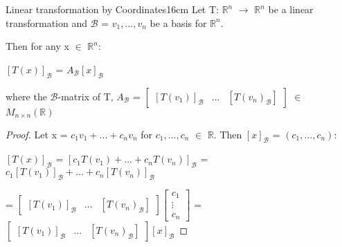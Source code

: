     \newpage



    \begin{wtheorem}{Linear transformation by Coordinates}{16cm}
        Let T: $\mathbb{R}^n$ $\rightarrow$ $\mathbb{R}^n$
        be a linear transformation and $\mathcal{B}$ = $v_1,...,v_n$
        be a basis for $\mathbb{R}^n$.
        
        Then for any x $\in$ $\mathbb{R}^n$:

        \hspace{0.5cm}
        $[T(x)]_{\mathcal{B}}$
        = $A_{\mathcal{B}}[x]_{\mathcal{B}}$

        where the {\color{lblue} $\mathcal{B}$-matrix of T}, $A_{\mathcal{B}}$ =
        $\begin{bmatrix}
            [T(v_1)]_{\mathcal{B}} & ... & [T(v_n)_{\mathcal{B}}]
        \end{bmatrix}$ $\in$ $M_{n \times n}(\mathbb{R})$
    \end{wtheorem}

    \begin{proof}
        Let x = $c_1v_1 + ... + c_nv_n$ for $c_1,...,c_n$ $\in$ $\mathbb{R}$.
        Then $[x]_{\mathcal{B}}$ = $(c_1,...,c_n)$:

        \hspace{0.5cm}
        $[T(x)]_{\mathcal{B}}$
        = $[c_1T(v_1) + ... + c_nT(v_n)]_{\mathcal{B}}$
        = $c_1[T(v_1)]_{\mathcal{B}} + ... + c_n[T(v_n)]_{\mathcal{B}}$
        
        \hspace{1.9cm}
        =
        $\begin{bmatrix}
            [T(v_1)]_{\mathcal{B}} & ... & [T(v_n)_{\mathcal{B}}]
        \end{bmatrix}
        \begin{bmatrix}
            c_1 \\
            \vdots \\
            c_n
        \end{bmatrix}$ =
        $\begin{bmatrix}
            [T(v_1)]_{\mathcal{B}} & ... & [T(v_n)_{\mathcal{B}}]
        \end{bmatrix}
        [x]_{\mathcal{B}}$  
    \end{proof}

    \vspace{0.5cm}



